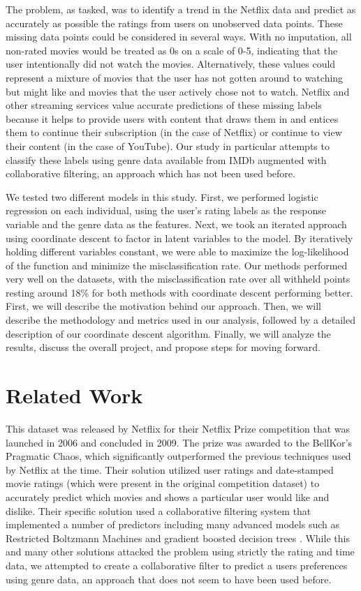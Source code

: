 \documentclass{article} %
\begin{document}
The problem, as tasked, was to identify a trend in the Netflix data and predict as accurately as possible the ratings from users on unobserved data points. These missing data points could be considered in several ways. With no imputation, all non-rated movies would be treated as 0s on a scale of 0-5, indicating that the user intentionally did not watch the movies. Alternatively, these values could represent a mixture of movies that the user has not gotten around to watching but might like and movies that the user actively chose not to watch. Netflix and other streaming services value accurate predictions of these missing labels because it helps to provide users with content that draws them in and entices them to continue their subscription (in the case of Netflix) or continue to view their content (in the case of YouTube). Our study in particular attempts to classify these labels using genre data available from IMDb augmented with collaborative filtering, an approach which has not been used before.

We tested two different models in this study. First, we performed logistic regression on each individual, using the user's rating labels as the response variable and the genre data as the features. Next, we took an iterated approach using coordinate descent to factor in latent variables to the model. By iteratively holding different variables constant, we were able to maximize the log-likelihood of the function and minimize the misclassification rate. Our methods performed very well on the datasets, with the misclassification rate over all withheld points resting around 18\% for both methods with coordinate descent performing better. First, we will describe the motivation behind our approach. Then, we will describe the methodology and metrics used in our analysis, followed by a detailed description of our coordinate descent algorithm. Finally, we will analyze the results, discuss the overall project, and propose steps for moving forward.

\section{Related Work}

This dataset was released by Netflix for their Netflix Prize competition that was launched in 2006 and concluded in 2009. The prize was awarded to the BellKor's Pragmatic Chaos, which significantly outperformed the previous techniques used by Netflix at the time. Their solution utilized user ratings and date-stamped movie ratings (which were present in the original competition dataset) to accurately predict which movies and shows a particular user would like and dislike. Their specific solution used a collaborative filtering system that implemented a number of predictors including many advanced models such as Restricted Boltzmann Machines and gradient boosted decision trees \cite{bellkor}. While this and many other solutions attacked the problem using strictly the rating and time data, we attempted to create a collaborative filter to predict a users preferences using genre data, an approach that does not seem to have been used before.
\end{document}

